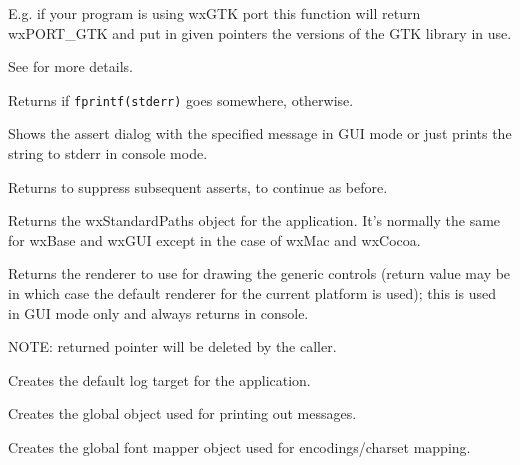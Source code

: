 E.g. if your program is using wxGTK port this function will return wxPORT_GTK and
put in given pointers the versions of the GTK library in use.

See  for more details.



\label{wxapptraitshasstderr}


Returns \true if {\tt fprintf(stderr)} goes somewhere, \false otherwise.



\label{wxapptraitsshowassertdialog}


Shows the assert dialog with the specified message in GUI mode or just prints
the string to stderr in console mode.

Returns \true to suppress subsequent asserts, \false to continue as before.



\label{wxapptraitsgetstandardpaths}


Returns the wxStandardPaths object for the application.
It's normally the same for wxBase and wxGUI except in the case of wxMac and wxCocoa.



\label{wxapptraitscreaterenderer}


Returns the renderer to use for drawing the generic controls (return value may be \NULL
in which case the default renderer for the current platform is used);
this is used in GUI mode only and always returns \NULL in console.

NOTE: returned pointer will be deleted by the caller.



\label{wxapptraitscreatelogtarget}


Creates the default log target for the application.



\label{wxapptraitscreatemessageoutput}


Creates the global object used for printing out messages.



\label{wxapptraitscreatefontmapper}


Creates the global font mapper object used for encodings/charset mapping.



